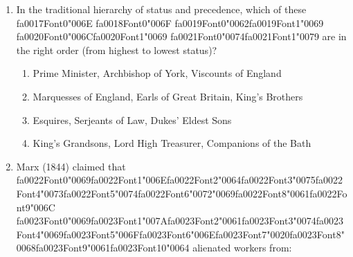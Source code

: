 \documentclass[12pt]{article}
\begin{document}
\begin{enumerate}[label=\arabic*.]
\begin{enumerate}[label=(\alph*)]
    \item the group of structural theories of society that he was reacting against
    \item the overall impression of ourselves that we try to give off to others
    \item a significant figure in early childhood who teaches us the general values of society
    \item an image of how people in the wider society might perceive our behaviour
\end{enumerate}
\item In the traditional hierarchy of status and precedence, which of these {\csname fa0017Font0\endcsname\char"006E} {\csname fa0018Font0\endcsname\char"006F} {\csname fa0019Font0\endcsname\char"0062}{\csname fa0019Font1\endcsname\char"0069} {\csname fa0020Font0\endcsname\char"006C}{\csname fa0020Font1\endcsname\char"0069} {\csname fa0021Font0\endcsname\char"0074}{\csname fa0021Font1\endcsname\char"0079} are in the right order (from highest to lowest status)?
\begin{enumerate}[label=(\alph*)]
    \item Prime Minister, Archbishop of York, Viscounts of England
    \item Marquesses of England, Earls of Great Britain, King's Brothers
    \item Esquires, Serjeants of Law, Dukes' Eldest Sons
    \item King's Grandsons, Lord High Treasurer, Companions of the Bath
\end{enumerate}
\item Marx (1844) claimed that {\csname fa0022Font0\endcsname\char"0069}{\csname fa0022Font1\endcsname\char"006E}{\csname fa0022Font2\endcsname\char"0064}{\csname fa0022Font3\endcsname\char"0075}{\csname fa0022Font4\endcsname\char"0073}{\csname fa0022Font5\endcsname\char"0074}{\csname fa0022Font6\endcsname\char"0072}{\char"0069}{\csname fa0022Font8\endcsname\char"0061}{\csname fa0022Font9\endcsname\char"006C} {\csname fa0023Font0\endcsname\char"0069}{\csname fa0023Font1\endcsname\char"007A}{\csname fa0023Font2\endcsname\char"0061}{\csname fa0023Font3\endcsname\char"0074}{\csname fa0023Font4\endcsname\char"0069}{\csname fa0023Font5\endcsname\char"006F}{\csname fa0023Font6\endcsname\char"006E}{\csname fa0023Font7\endcsname\char"0020}{\csname fa0023Font8\endcsname\char"0068}{\csname fa0023Font9\endcsname\char"0061}{\csname fa0023Font10\endcsname\char"0064} alienated workers from:

\end{enumerate}
\end{document}
